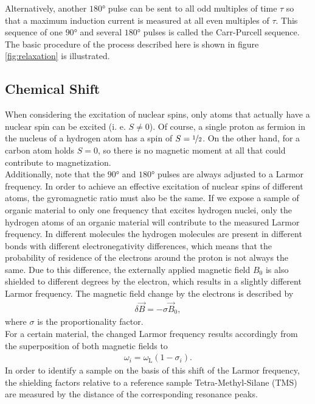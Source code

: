 Alternatively, another $\ang{180}$ pulse can be sent to all odd multiples of time $\tau$ so that a maximum induction current is measured at all even multiples of $\tau$.
This sequence of one $\ang{90}$ and several $\ang{180}$ pulses is called the Carr-Purcell sequence.
The basic procedure of the process described here is shown in figure \ref{fig:relaxation} is illustrated.



\subsection{Chemical Shift}
When considering the excitation of nuclear spins, only atoms that actually have a nuclear spin can be excited (i. e. $S\neq 0$).
Of course, a single proton as fermion in the nucleus of a hydrogen atom has a spin of $S = \nicefrac{1}{2}$.
On the other hand, for a carbon atom holds $S=0$, so there is no magnetic moment at all that could contribute to magnetization.\\
Additionally, note that the $\ang{90}$ and $\ang{180}$ pulses are always adjusted to a Larmor frequency.
In order to achieve an effective excitation of nuclear spins of different atoms, the gyromagnetic ratio must also be the same.
If we expose a sample of organic material to only one frequency that excites hydrogen nuclei, only the hydrogen atoms of an organic material will contribute to the measured Larmor frequency.
In different molecules the hydrogen molecules are present in different bonds with different electronegativity differences, which means that the probability of residence of the electrons around the proton is not always the same.
Due to this difference, the externally applied magnetic field $B_0$ is also shielded to different degrees by the electron, which results in a slightly different Larmor frequency.
The magnetic field change by the electrons is described by
\begin{align}
\delta\vec{B}=-\sigma\vec{B}_0,
\end{align}
where $\sigma$ is the proportionality factor.\\
For a certain material, the changed Larmor frequency results accordingly from the superposition of both magnetic fields to
\begin{align}
\omega_i=\omega_\text{L}(1-\sigma_i).
\end{align}
In order to identify a sample on the basis of this shift of the Larmor frequency, the shielding factors relative to a reference sample Tetra-Methyl-Silane (TMS) are measured by the distance of the corresponding resonance peaks.
